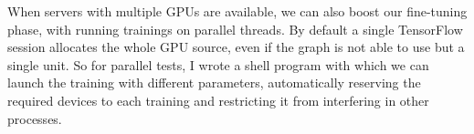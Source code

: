 When servers with multiple GPUs are available, we can also boost our fine-tuning phase, with running trainings on parallel threads.
By default a single TensorFlow session allocates the whole GPU source, even if the graph is not able to use but a single unit.
So for parallel tests, I wrote a shell program with which we can launch the training with different parameters, automatically reserving the required devices to each training and restricting it from interfering in other processes.
